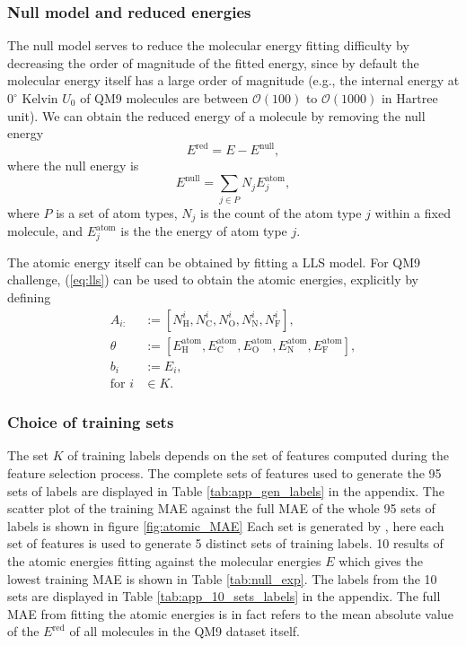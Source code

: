 \documentclass[12pt]{article}
\begin{document}
\subsubsection{Null model and reduced energies}
\label{subsubsec:ered}
The null model serves to reduce the molecular energy fitting difficulty by decreasing the order of magnitude of the fitted energy, since by default the molecular energy itself has a large order of magnitude (e.g., the internal energy at $0^{\circ}$ Kelvin $U_0$ of QM9 molecules are between $\mathcal{O}(100)$ to $\mathcal{O}(1000)$ in Hartree unit). We can obtain the reduced energy of a molecule by removing the null energy
\begin{equation}
	\label{eq:ered}
	E^\text{red} = E - E^\text{null},
\end{equation}
where the null energy is
\begin{equation}
	E^\text{null} = \sum_{j \in P} N_j E^\text{atom}_j,
\end{equation}
where $P$ is a set of atom types, $N_j$ is the count of the atom type $j$ within a fixed molecule, and $E^\text{atom}_j$ is the the energy of atom type $j$.

The atomic energy itself can be obtained by fitting a LLS model. For QM9 challenge, (\ref{eq:lls}) can be used to obtain the atomic energies, explicitly by defining
\begin{equation}
	\label{eq:enull2}
	\begin{split}
		A_{i:} &:= [N^i_\text{H}, N^i_\text{C}, N^i_\text{O}, N^i_\text{N}, N^i_\text{F}], \\
		\theta &:= [E^\text{atom}_\text{H}, E^\text{atom}_\text{C}, E^\text{atom}_\text{O}, E^\text{atom}_\text{N}, E^\text{atom}_\text{F}], \\
		b_i &:= E_i, \\
		\text{for }i &\in K.
	\end{split}
\end{equation}
\subsubsection{Choice of training sets}
The set $K$ of training labels depends on the set of features computed during the feature selection process. 
The complete sets of features used to generate the 95 sets of labels are displayed in Table \ref{tab:app_gen_labels} in the appendix. 
The scatter plot of the training MAE against the full MAE of the whole 95 sets of labels is shown in figure \ref{fig:atomic_MAE}
Each set is generated by , here each set of features is used to generate 5 distinct sets of training labels. 10 results of the atomic energies fitting against the molecular energies $E$ which gives the lowest training MAE is shown in Table \ref{tab:null_exp}. 
The labels from the 10 sets are displayed in Table \ref{tab:app_10_sets_labels} in the appendix.
The full MAE from fitting the atomic energies is in fact refers to the mean absolute value of the $E^\text{red}$ of all molecules in the QM9 dataset itself.
\end{document}
